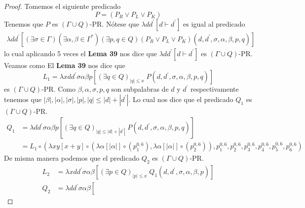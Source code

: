 \begin{lemma}
\begin{proof}
    \noindent Tomemos el siguiente predicado
    \[
      P = (P_{R}\vee P_{L}\vee P_{K})
    \]
    Tenemos que $P$ es $(\Gamma \cup Q)$-PR.
    \noindent Nótese que $\lambda dd^{\prime }\left[ d\vdash d^{\prime }\right] $ es igual al predicado
    \begin{eqnarray}
      \nonumber \lambda dd^{\prime }\left[ (\exists \sigma \in \Gamma )(\exists \alpha ,\beta \in \Gamma ^{\ast })
                (\exists p,q\in Q)(P_{R}\vee P_{L}\vee P_{K})(d,d^{\prime },\sigma ,\alpha ,\beta ,p,q)\right]
    \end{eqnarray}
    lo cual aplicando 5 veces el \textbf{Lema 39} nos dice que $\lambda dd^{\prime } \left[ d\vdash d^{\prime }\right]$
    es $(\Gamma \cup Q)$-PR. Veamos como
    El \textbf{Lema 39} nos dice que
    \[
      L_1 = \lambda x d d^{\prime }\sigma\alpha\beta p
              \left[
                (\exists q\in Q)_{|q| \leq x}\; P(d,d^{\prime },\sigma ,\alpha ,\beta ,p,q)
              \right]
    \]
    es $(\Gamma \cup Q)$-PR. Como $\beta, \alpha, \sigma, p, q$ son subpalabras de $d$ y $d^{\prime}$ respectivamente
    tenemos que $ |\beta|, |\alpha|, |\sigma|, |p|, |q| \leq |d| + |d^{\prime}|$. Lo cual nos dice que el predicado
    $Q_1$ es $(\Gamma \cup Q)$-PR.
    \begin{align*}
      Q_1 &=  \lambda d d^{\prime }\sigma\alpha\beta p
                \left[
                  (\exists q\in Q)_{|q| \leq |d| + |d^{\prime}|}\; P(d,d^{\prime },\sigma ,\alpha ,\beta ,p,q)
                \right] \\[10pt]
          &= L_1  \circ (
                    \lambda x y \left[ x + y \right]
                      \circ(
                        \lambda \alpha \left[ |\alpha|\right] \circ (p_{1}^{0,6}),
                        \lambda \alpha \left[ |\alpha|\right] \circ (p_{2}^{0,6})
                    ),
                    p_{1}^{0,6},
                    p_{2}^{0,6},
                    p_{3}^{0,6},
                    p_{4}^{0,6},
                    p_{5}^{0,6},
                    p_{6}^{0,6}
                  )
    \end{align*}
    De misma manera podemos que el predicado $Q_2$ es $(\Gamma \cup Q)$-PR.
    \begin{align*}
      L_2 &=  \lambda x d d^{\prime }\sigma\alpha\beta
                \left[
                  (\exists p\in Q)_{|p| \leq x}\; Q_1(d,d^{\prime },\sigma ,\alpha ,\beta , p)
                \right] \\[10pt]
      Q_2 &=  \lambda d d^{\prime }\sigma\alpha\beta
                \left[

\end{align*}
\end{proof}
\end{lemma}
